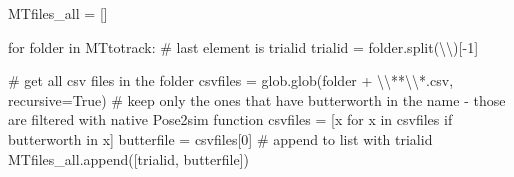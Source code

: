 \documentclass[
  letterpaper,
  DIV=11,
  numbers=noendperiod]{scrreprt}
\newenvironment{Shaded}{\begin{snugshade}}{\end{snugshade}}
\newcommand{\CharTok}[1]{\textcolor[rgb]{0.13,0.47,0.30}{#1}}
\newcommand{\CommentTok}[1]{\textcolor[rgb]{0.37,0.37,0.37}{#1}}
\newcommand{\ControlFlowTok}[1]{\textcolor[rgb]{0.00,0.23,0.31}{#1}}
\newcommand{\DecValTok}[1]{\textcolor[rgb]{0.68,0.00,0.00}{#1}}
\newcommand{\KeywordTok}[1]{\textcolor[rgb]{0.00,0.23,0.31}{#1}}
\newcommand{\NormalTok}[1]{\textcolor[rgb]{0.00,0.23,0.31}{#1}}
\newcommand{\OperatorTok}[1]{\textcolor[rgb]{0.37,0.37,0.37}{#1}}
\newcommand{\StringTok}[1]{\textcolor[rgb]{0.13,0.47,0.30}{#1}}
\newcommand{\VariableTok}[1]{\textcolor[rgb]{0.07,0.07,0.07}{#1}}
\begin{document}
\begin{Shaded}
\begin{Highlighting}[]
\NormalTok{MTfiles\_all }\OperatorTok{=}\NormalTok{ []}

\ControlFlowTok{for}\NormalTok{ folder }\KeywordTok{in}\NormalTok{ MTtotrack:}
    \CommentTok{\# last element is trialid}
\NormalTok{    trialid }\OperatorTok{=}\NormalTok{ folder.split(}\StringTok{\textquotesingle{}}\CharTok{\textbackslash{}\textbackslash{}}\StringTok{\textquotesingle{}}\NormalTok{)[}\OperatorTok{{-}}\DecValTok{1}\NormalTok{]}
    
    \CommentTok{\# get all csv files in the folder}
\NormalTok{    csvfiles }\OperatorTok{=}\NormalTok{ glob.glob(folder }\OperatorTok{+} \StringTok{\textquotesingle{}}\CharTok{\textbackslash{}\textbackslash{}}\StringTok{**}\CharTok{\textbackslash{}\textbackslash{}}\StringTok{*.csv\textquotesingle{}}\NormalTok{, recursive}\OperatorTok{=}\VariableTok{True}\NormalTok{)}
    \CommentTok{\# keep only the ones that have butterworth in the name {-} those are filtered with native Pose2sim function}
\NormalTok{    csvfiles }\OperatorTok{=}\NormalTok{ [x }\ControlFlowTok{for}\NormalTok{ x }\KeywordTok{in}\NormalTok{ csvfiles }\ControlFlowTok{if} \StringTok{\textquotesingle{}butterworth\textquotesingle{}} \KeywordTok{in}\NormalTok{ x]}
\NormalTok{    butterfile }\OperatorTok{=}\NormalTok{ csvfiles[}\DecValTok{0}\NormalTok{]}
    \CommentTok{\# append to list with trialid}
\NormalTok{    MTfiles\_all.append([trialid, butterfile])}
\end{Highlighting}
\end{Shaded}
\end{document}
